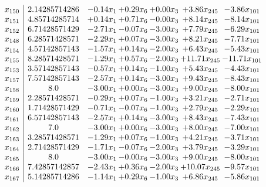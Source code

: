 \documentclass[8pt]{article}
\begin{document}
\[\begin{array}{c| c c@{\hskip 2pt} c@{\hskip 2pt} c@{\hskip 2pt} c@{\hskip 2pt} c@{\hskip 2pt} }
 x_{150}   &  2.14285714286 & -0.14 x_{1} & +  0.29 x_{6} & +  0.00 x_{3} & +  3.86 x_{245} & -3.86 x_{101}\\
 x_{151}   &  4.85714285714 & +  0.14 x_{1} & +  0.71 x_{6} & -0.00 x_{3} & +  8.14 x_{245} & -8.14 x_{101}\\
 x_{152}   &  6.71428571429 & -2.71 x_{1} & -0.07 x_{6} & -3.00 x_{3} & +  7.79 x_{245} & -6.29 x_{101}\\
 x_{148}   &  6.28571428571 & -2.29 x_{1} & +  0.07 x_{6} & -3.00 x_{3} & +  8.21 x_{245} & -7.71 x_{101}\\
 x_{154}   &  4.57142857143 & -1.57 x_{1} & +  0.14 x_{6} & -2.00 x_{3} & +  6.43 x_{245} & -5.43 x_{101}\\
 x_{155}   &  8.28571428571 & -1.29 x_{1} & +  0.57 x_{6} & -2.00 x_{3} & + 11.71 x_{245} & -11.71 x_{101}\\
 x_{153}   &  3.57142857143 & -0.57 x_{1} & +  0.14 x_{6} & -1.00 x_{3} & +  5.43 x_{245} & -4.43 x_{101}\\
 x_{157}   &  7.57142857143 & -2.57 x_{1} & +  0.14 x_{6} & -3.00 x_{3} & +  9.43 x_{245} & -8.43 x_{101}\\
 x_{158}   &  8.0 & -3.00 x_{1} & +  0.00 x_{6} & -3.00 x_{3} & +  9.00 x_{245} & -8.00 x_{101}\\
 x_{159}   &  2.28571428571 & -0.29 x_{1} & +  0.07 x_{6} & -1.00 x_{3} & +  3.21 x_{245} & -2.71 x_{101}\\
 x_{160}   &  1.71428571429 & -0.71 x_{1} & -0.07 x_{6} & -1.00 x_{3} & +  2.79 x_{245} & -2.29 x_{101}\\
 x_{161}   &  6.57142857143 & -2.57 x_{1} & +  0.14 x_{6} & -3.00 x_{3} & +  8.43 x_{245} & -7.43 x_{101}\\
 x_{162}   &  7.0 & -3.00 x_{1} & +  0.00 x_{6} & -3.00 x_{3} & +  8.00 x_{245} & -7.00 x_{101}\\
 x_{163}   &  3.28571428571 & -1.29 x_{1} & +  0.07 x_{6} & -1.00 x_{3} & +  4.21 x_{245} & -3.71 x_{101}\\
 x_{164}   &  2.71428571429 & -1.71 x_{1} & -0.07 x_{6} & -2.00 x_{3} & +  3.79 x_{245} & -3.29 x_{101}\\
 x_{165}   &  8.0 & -3.00 x_{1} & -0.00 x_{6} & -3.00 x_{3} & +  9.00 x_{245} & -8.00 x_{101}\\
 x_{166}   &  7.42857142857 & -2.43 x_{1} & +  0.36 x_{6} & -2.00 x_{3} & + 10.07 x_{245} & -9.57 x_{101}\\
 x_{167}   &  5.14285714286 & -1.14 x_{1} & +  0.29 x_{6} & -1.00 x_{3} & +  6.86 x_{245} & -5.86 x_{101}\\

\end{array}\]
\end{document}
